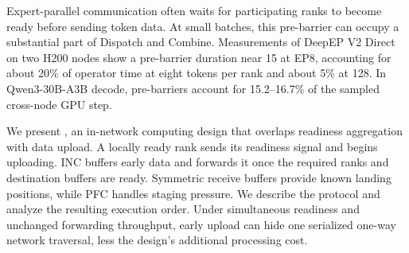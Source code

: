 Expert-parallel communication often waits for participating ranks to become ready before sending token data. At small batches, this pre-barrier can occupy a substantial part of Dispatch and Combine. Measurements of DeepEP V2 Direct on two H200 nodes show a pre-barrier duration near 15\us{} at EP8, accounting for about 20\% of operator time at eight tokens per rank and about 5\% at 128. In Qwen3-30B-A3B decode, pre-barriers account for 15.2--16.7\% of the sampled cross-node GPU step.

We present \sys{}, an in-network computing design that overlaps readiness aggregation with data upload. A locally ready rank sends its readiness signal and begins uploading. INC buffers early data and forwards it once the required ranks and destination buffers are ready. Symmetric receive buffers provide known landing positions, while PFC handles staging pressure. We describe the protocol and analyze the resulting execution order. Under simultaneous readiness and unchanged forwarding throughput, early upload can hide one serialized one-way network traversal, less the design's additional processing cost.
